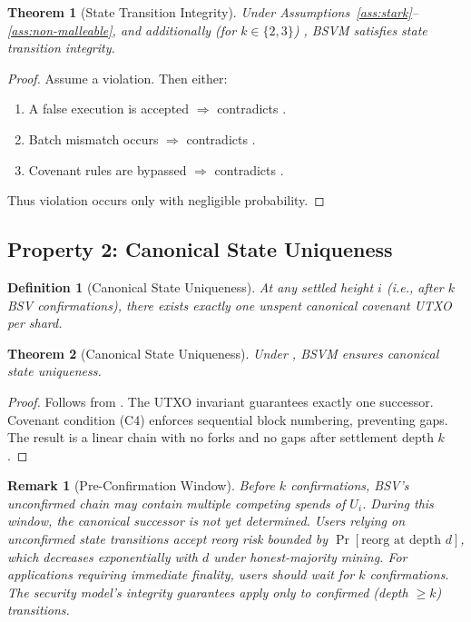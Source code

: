 \documentclass[11pt,a4paper]{article}
\newtheorem{definition}{Definition}[section]
\newtheorem{theorem}{Theorem}[section]
\newtheorem{remark}{Remark}[section]
\begin{document}
\begin{theorem}[State Transition Integrity]\label{thm:sti}
Under Assumptions~\ref{ass:stark}--\ref{ass:non-malleable}, and additionally (for $k \in \{2, 3\}$) , BSVM satisfies state transition integrity.
\end{theorem}

\begin{proof}
Assume a violation. Then either:
\begin{enumerate}[nosep]
    \item A false execution is accepted $\Rightarrow$ contradicts .
    \item Batch mismatch occurs $\Rightarrow$ contradicts .
    \item Covenant rules are bypassed $\Rightarrow$ contradicts .
\end{enumerate}
Thus violation occurs only with negligible probability. \qedhere
\end{proof}


\subsection{Property 2: Canonical State Uniqueness}

\begin{definition}[Canonical State Uniqueness]\label{def:unique}
At any settled height $i$ (i.e., after $k$ BSV confirmations), there exists exactly one unspent canonical covenant UTXO per shard.
\end{definition}

\begin{theorem}[Canonical State Uniqueness]\label{thm:unique}
Under , BSVM ensures canonical state uniqueness.
\end{theorem}

\begin{proof}
Follows from . The UTXO invariant guarantees exactly one successor. Covenant condition (C4) enforces sequential block numbering, preventing gaps. The result is a linear chain with no forks and no gaps after settlement depth $k$. \qedhere
\end{proof}

\begin{remark}[Pre-Confirmation Window]\label{rem:preconf}
Before $k$ confirmations, BSV's unconfirmed chain may contain multiple competing spends of $U_i$. During this window, the canonical successor is not yet determined. Users relying on unconfirmed state transitions accept reorg risk bounded by $\Pr[\text{reorg at depth } d]$, which decreases exponentially with $d$ under honest-majority mining. For applications requiring immediate finality, users should wait for $k$ confirmations. The security model's integrity guarantees apply only to confirmed (depth $\geq k$) transitions.
\end{remark}
\end{document}
